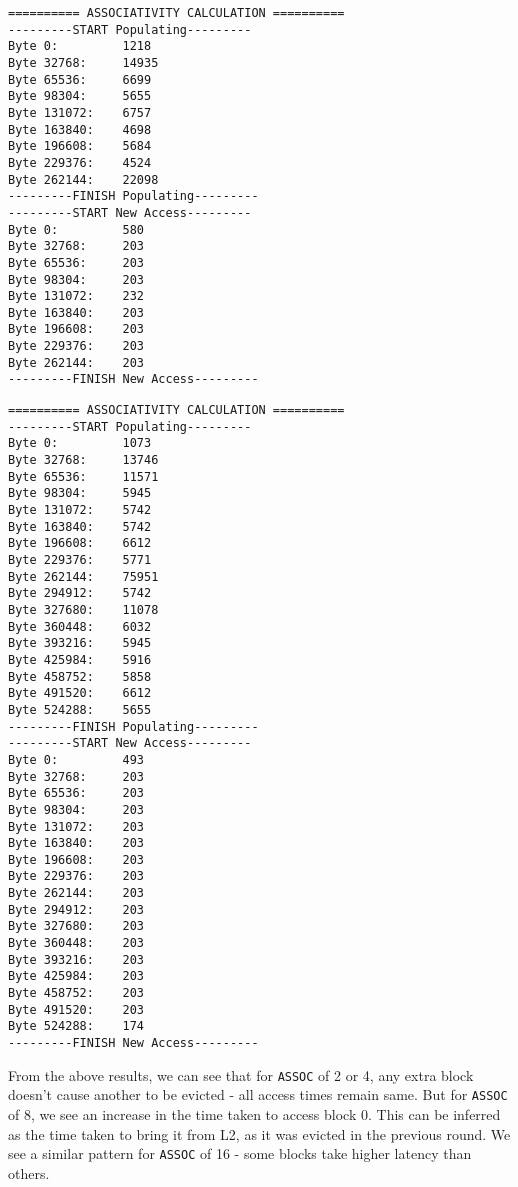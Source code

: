 \documentclass[12pt,a4paper,english]{paper}
\newenvironment{colorboxed}[4][gray]{
\begin{tcolorbox}[colback=#1!3!white,colframe=#1(ryb)!50!black,title=\textbf{#2 #3},#4]
}{
\end{tcolorbox}
}
\begin{document}
\begin{colorboxed}{Output: }{\texttt{\textbf{ASSOC = 8}}}{breakable}
\begin{verbatim}
========== ASSOCIATIVITY CALCULATION ==========
---------START Populating---------
Byte 0:         1218
Byte 32768:     14935
Byte 65536:     6699
Byte 98304:     5655
Byte 131072:    6757
Byte 163840:    4698
Byte 196608:    5684
Byte 229376:    4524
Byte 262144:    22098
---------FINISH Populating---------
---------START New Access---------
Byte 0:         580
Byte 32768:     203
Byte 65536:     203
Byte 98304:     203
Byte 131072:    232
Byte 163840:    203
Byte 196608:    203
Byte 229376:    203
Byte 262144:    203
---------FINISH New Access---------
\end{verbatim}
\end{colorboxed}

\begin{colorboxed}{Output: }{\texttt{\textbf{ASSOC = 16}}}{breakable}
\begin{verbatim}
========== ASSOCIATIVITY CALCULATION ==========
---------START Populating---------
Byte 0:         1073
Byte 32768:     13746
Byte 65536:     11571
Byte 98304:     5945
Byte 131072:    5742
Byte 163840:    5742
Byte 196608:    6612
Byte 229376:    5771
Byte 262144:    75951
Byte 294912:    5742
Byte 327680:    11078
Byte 360448:    6032
Byte 393216:    5945
Byte 425984:    5916
Byte 458752:    5858
Byte 491520:    6612
Byte 524288:    5655
---------FINISH Populating---------
---------START New Access---------
Byte 0:         493
Byte 32768:     203
Byte 65536:     203
Byte 98304:     203
Byte 131072:    203
Byte 163840:    203
Byte 196608:    203
Byte 229376:    203
Byte 262144:    203
Byte 294912:    203
Byte 327680:    203
Byte 360448:    203
Byte 393216:    203
Byte 425984:    203
Byte 458752:    203
Byte 491520:    203
Byte 524288:    174
---------FINISH New Access---------
\end{verbatim}
\end{colorboxed}

From the above results, we can see that for \texttt{ASSOC} of 2 or 4, any extra block doesn't cause another to be evicted - all access times remain same. But for \texttt{ASSOC} of 8, we see an increase in the time taken to access block 0. This can be inferred as the time taken to bring it from L2, as it was evicted in the previous round. We see a similar pattern for \texttt{ASSOC} of 16 - some blocks take higher latency than others.


\newpage %



\end{document}
